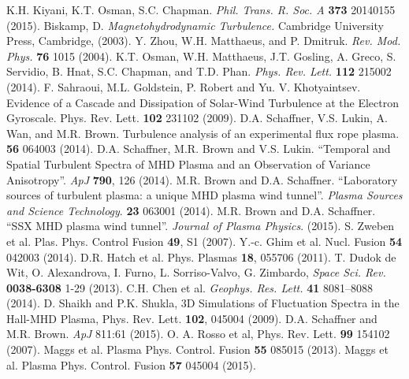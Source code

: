 \documentclass[aip,pop,amsmath,amssymb,preprint,superscriptaddress]{revtex4-1} %
\begin{document}
\providecommand{\noopsort}[1]{}\providecommand{\singleletter}[1]{#1}%
\begin{thebibliography}{10}

 K.H. Kiyani, K.T. Osman, S.C. Chapman. {\it Phil. Trans. R. Soc. A} {\bf 373} 20140155 (2015).
 Biskamp, D. {\it Magnetohydrodynamic Turbulence.} Cambridge University Press, Cambridge, (2003).
 Y. Zhou, W.H. Matthaeus, and P. Dmitruk. {\it Rev. Mod. Phys.} {\bf 76} 1015 (2004).
 K.T. Osman, W.H. Matthaeus, J.T. Gosling, A. Greco, S. Servidio, B. Hnat, S.C. Chapman, and T.D. Phan. {\it Phys. Rev. Lett.} {\bf 112} 215002 (2014).
 F. Sahraoui, M.L. Goldstein, P. Robert and Yu. V. Khotyaintsev. Evidence of a Cascade and Dissipation of Solar-Wind Turbulence at the Electron Gyroscale. Phys. Rev. Lett. {\bf 102} 231102 (2009).
 D.A. Schaffner, V.S. Lukin, A. Wan, and M.R. Brown. Turbulence analysis of an experimental flux rope plasma. {\bf 56} 064003 (2014).
 D.A. Schaffner, M.R. Brown and V.S. Lukin. ``Temporal and Spatial Turbulent Spectra of MHD Plasma and an Observation of Variance Anisotropy''. {\it ApJ} {\bf 790}, 126 (2014).
 M.R. Brown and D.A. Schaffner. ``Laboratory sources of turbulent plasma: a unique MHD plasma wind tunnel''. {\it Plasma Sources and Science Technology}. {\bf 23} 063001 (2014).
 M.R. Brown and D.A. Schaffner. ``SSX MHD plasma wind tunnel''. {\it Journal of Plasma Physics}. (2015).
 S. Zweben et al. Plas. Phys. Control Fusion {\bf 49}, S1 (2007).
 Y.-c. Ghim et al. Nucl. Fusion {\bf 54} 042003 (2014).
 D.R. Hatch et al. Phys. Plasmas {\bf 18}, 055706 (2011).
 T. Dudok de Wit, O. Alexandrova, I. Furno, L. Sorriso-Valvo, G. Zimbardo, {\it Space Sci. Rev.} {\bf 0038-6308} 1-29 (2013).
 C.H. Chen et al. {\it Geophys. Res. Lett.} {\bf 41} 8081–8088 (2014).
 D. Shaikh and P.K. Shukla, 3D Simulations of Fluctuation Spectra in the Hall-MHD Plasma, Phys. Rev. Lett. {\bf 102}, 045004 (2009).
 D.A. Schaffner and M.R. Brown. {\it ApJ} 811:61 (2015).
 O. A. Rosso et al, Phys. Rev. Lett. {\bf 99} 154102 (2007).
 Maggs et al. Plasma Phys. Control. Fusion {\bf 55} 085015 (2013).
 Maggs et al. Plasma Phys. Control. Fusion {\bf 57}  045004 (2015).

\end{thebibliography}
\end{document}
